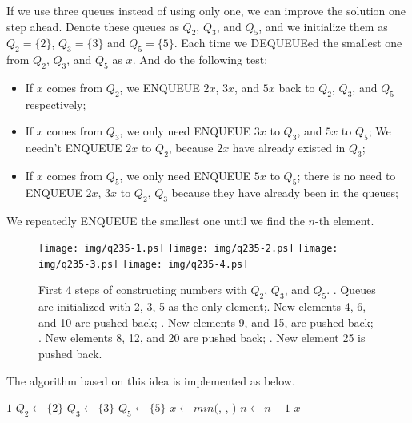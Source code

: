 \documentclass{article}
\begin{document}
If we use three queues instead of using only one, we can improve the solution one
step ahead. Denote these queues as $Q_2$, $Q_3$, and $Q_5$, and we initialize
them as $Q_2=\{ 2 \}$, $Q_3 = \{ 3\}$ and $Q_5 = \{ 5 \}$. Each time we DEQUEUEed
the smallest one from $Q_2$, $Q_3$, and $Q_5$ as $x$. And do the following test:

\begin{itemize}
\item If $x$ comes from $Q_2$, we ENQUEUE $2x$, $3x$, and $5x$ back to
$Q_2$, $Q_3$, and $Q_5$ respectively;
\item If $x$ comes from $Q_3$, we only need ENQUEUE $3x$ to $Q_3$, and $5x$ to $Q_5$;
We needn't ENQUEUE $2x$ to $Q_2$, because $2x$ have already existed in $Q_3$;
\item If $x$ comes from $Q_5$, we only need ENQUEUE $5x$ to $Q_5$; there is
no need to ENQUEUE $2x$, $3x$ to $Q_2$, $Q_3$ because they have already been
in the queues;
\end{itemize}

We repeatedly ENQUEUE the smallest one until we find the $n$-th element.

\begin{figure}[htbp]
       \begin{center}
       	  \texttt{[image: img/q235-1.ps]}
       	  \texttt{[image: img/q235-2.ps]}
       	  \texttt{[image: img/q235-3.ps]}
       	  \texttt{[image: img/q235-4.ps]}
        \caption{First 4 steps of constructing numbers with $Q_2$, $Q_3$, and $Q_5$. . Queues are initialized with 2, 3, 5 as the only element;. New elements 4, 6, and 10 are pushed back; . New elements 9, and 15, are pushed back; . New elements 8, 12, and 20 are pushed back; . New element 25 is pushed back.} \label{fig:q235}
       \end{center}
\end{figure}

The algorithm based on this idea is implemented as below.

\begin{algorithmic}[1]
    \State \Return $1$
  \Else
    \State $Q_2 \gets \{ 2 \}$
    \State $Q_3 \gets \{ 3 \}$
    \State $Q_5 \gets \{ 5 \}$
      \State $x \gets min($, , $)$
        \State {}
        \State {}
        \State {}
        \State {}
        \State {}
        \State {}
        \State {}
      \Else
        \State {}
        \State {}
      \EndIf
      \State $n \gets n - 1$
    \EndWhile
    \State \Return $x$
  \EndIf
\EndFunction
\end{algorithmic}
\end{document}
